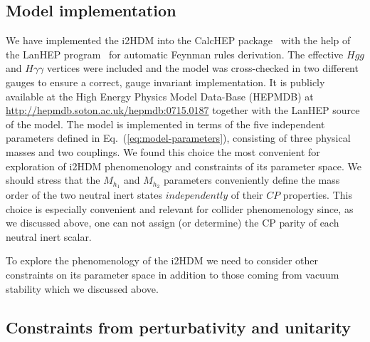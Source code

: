 \documentclass[12pt,a4paper]{article}
\begin{document}
\subsection{Model implementation}
We have implemented the i2HDM into the CalcHEP package~\cite{CALCHEP}
with the help of the LanHEP program~\cite{Semenov:1998eb,Semenov:2008jy}
for automatic Feynman rules derivation. The effective $Hgg$ and $H\gamma\gamma$ vertices were included and the model was cross-checked in two different gauges
to ensure a correct, gauge invariant implementation.
It is publicly available at the
High Energy Physics Model Data-Base (HEPMDB) \cite{Brooijmans:2012yi} at
\url{http://hepmdb.soton.ac.uk/hepmdb:0715.0187}
together with the LanHEP source of the model.
The model is implemented in terms of the five independent parameters
defined in Eq.~(\ref{eq:model-parameters}), consisting of three physical masses
and two couplings.
We found this choice the most convenient for exploration of i2HDM phenomenology
and constraints of its parameter space.
We should stress that the $M_{h_1}$ and $M_{h_2}$ parameters 
conveniently  define the mass order of the two neutral inert states 
$independently$ of their $CP$ properties. 
This choice is especially convenient and relevant for collider
phenomenology since, as we discussed above, one can not assign (or determine) the CP parity of each neutral inert scalar.

To explore the phenomenology of the i2HDM we need to consider other constraints on its parameter space
in addition to those coming from vacuum stability which we discussed above.



%
\subsection{Constraints from perturbativity and unitarity}
\end{document}
